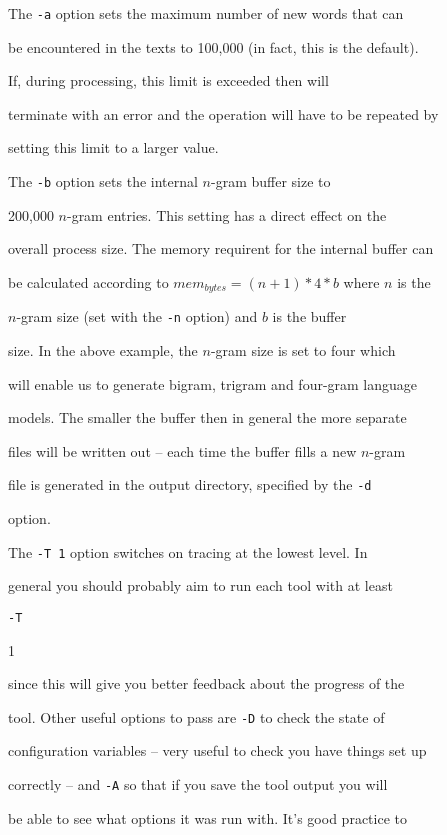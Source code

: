 The \texttt{-a} option sets the maximum number of new words that can


be encountered in the texts to 100,000 (in fact, this is the default).


If, during processing, this limit is exceeded then  will


terminate with an error and the operation will have to be repeated by


setting this limit to a larger value.





The \texttt{-b} option sets the internal $n$-gram buffer size to


200,000 $n$-gram entries. This setting has a direct effect on the


overall process size. The memory requirent for the internal buffer can


be calculated according to $mem_{bytes} = (n+1)*4*b$ where $n$ is the


$n$-gram size (set with the \texttt{-n} option) and $b$ is the buffer


size.  In the above example, the $n$-gram size is set to four which


will enable us to generate bigram, trigram and four-gram language


models.  The smaller the buffer then in general the more separate


files will be written out -- each time the buffer fills a new $n$-gram


file is generated in the output directory, specified by the {\tt -d}


option.





The {\tt -T 1} option switches on tracing at the lowest level.  In


general you should probably aim to run each tool with at least {\tt -T


1} since this will give you better feedback about the progress of the


tool.  Other useful options to pass are {\tt -D} to check the state of


configuration variables -- very useful to check you have things set up


correctly -- and {\tt -A} so that if you save the tool output you will


be able to see what options it was run with.  It's good practice to


